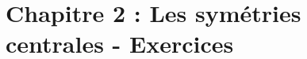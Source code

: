 

\newpage

\section*{Chapitre 2 : Les symétries centrales - Exercices}









\newpage
\setcounter{exrcntr}{0}









